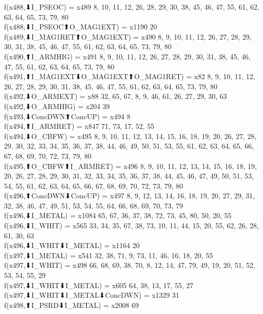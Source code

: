 f(x488,⬇I_PSEOC) = x489 {8, 10, 11, 12, 26, 28, 29, 30, 38, 45, 46, 47, 55, 61, 62, 63, 64, 65, 73, 79, 80} \\
f(x488,⬇I_PSEOC⬆O_MAG1EXT) = x1190 {20} \\
f(x489,⬇I_MAG1RET⬆O_MAG1EXT) = x490 {8, 9, 10, 11, 12, 26, 27, 28, 29, 30, 31, 38, 45, 46, 47, 55, 61, 62, 63, 64, 65, 73, 79, 80} \\
f(x490,⬆I_ARMHIG) = x491 {8, 9, 10, 11, 12, 26, 27, 28, 29, 30, 31, 38, 45, 46, 47, 55, 61, 62, 63, 64, 65, 73, 79, 80} \\
f(x491,⬆I_MAG1EXT⬇O_MAG1EXT⬆O_MAG1RET) = x82 {8, 9, 10, 11, 12, 26, 27, 28, 29, 30, 31, 38, 45, 46, 47, 55, 61, 62, 63, 64, 65, 73, 79, 80} \\
f(x492,⬇O_ARMEXT) = x88 {32, 65, 67, 8, 9, 46, 61, 26, 27, 29, 30, 63} \\
f(x492,⬇O_ARMHIG) = x204 {39} \\
f(x493,⬇ConcDWN⬆ConcUP) = x494 {8} \\
f(x494,⬆I_ARMRET) = x847 {71, 73, 17, 52, 55} \\
f(x494,⬇O_CBFW) = x495 {8, 9, 10, 11, 12, 13, 14, 15, 16, 18, 19, 20, 26, 27, 28, 29, 30, 32, 33, 34, 35, 36, 37, 38, 44, 46, 49, 50, 51, 53, 55, 61, 62, 63, 64, 65, 66, 67, 68, 69, 70, 72, 73, 79, 80} \\
f(x495,⬆O_CBFW⬆I_ARMRET) = x496 {8, 9, 10, 11, 12, 13, 14, 15, 16, 18, 19, 20, 26, 27, 28, 29, 30, 31, 32, 33, 34, 35, 36, 37, 38, 44, 45, 46, 47, 49, 50, 51, 53, 54, 55, 61, 62, 63, 64, 65, 66, 67, 68, 69, 70, 72, 73, 79, 80} \\
f(x496,⬆ConcDWN⬇ConcUP) = x497 {8, 9, 12, 13, 14, 16, 18, 19, 20, 27, 29, 31, 32, 38, 46, 47, 49, 51, 53, 54, 55, 64, 66, 68, 69, 70, 73, 79} \\
f(x496,⬇I_METAL) = x1084 {65, 67, 36, 37, 38, 72, 73, 45, 80, 50, 20, 55} \\
f(x496,⬇I_WHIT) = x565 {33, 34, 35, 67, 38, 73, 10, 11, 44, 15, 20, 55, 62, 26, 28, 61, 30, 63} \\
f(x496,⬇I_WHIT⬇I_METAL) = x1164 {20} \\
f(x497,⬇I_METAL) = x541 {32, 38, 71, 9, 73, 11, 46, 16, 18, 20, 55} \\
f(x497,⬇I_WHIT) = x498 {66, 68, 69, 38, 70, 8, 12, 14, 47, 79, 49, 19, 20, 51, 52, 53, 54, 55, 29} \\
f(x497,⬇I_WHIT⬇I_METAL) = x605 {64, 38, 13, 17, 55, 27} \\
f(x497,⬇I_WHIT⬇I_METAL⬇ConcDWN) = x1329 {31} \\
f(x498,⬆I_PSRD⬇I_METAL) = x2008 {69} \\
